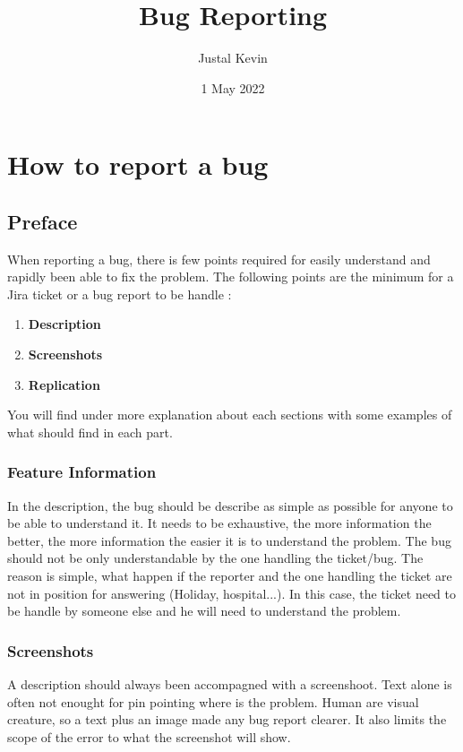 \documentclass[a4paper,article,oneside]{memoir}
\title{\textbf{Bug Reporting}}
\author{Justal Kevin}
\date{1 May 2022}
\begin{document}
\maketitle
\thispagestyle{empty}
\tableofcontents
\part{How to report a bug}
	\chapter*{Preface}
		When reporting a bug, there is few points required for easily understand and rapidly been able to fix the problem. The following points are the minimum for a Jira ticket or a bug report to be handle :
	
        \begin{enumerate}
  			\item {\color{BrickRed}\textbf{Description}}
  			\item {\color{BrickRed}\textbf{Screenshots}}
  			\item {\color{BrickRed}\textbf{Replication}}
		\end{enumerate}
		
	You will find under more explanation about each sections with some examples of what should find in each part.
        \section*{Feature Information}
        In the description, the bug should be describe as simple as possible for anyone to be able to understand it. It needs to be exhaustive, the more information the better, the more information the easier it is to understand the problem. The bug should not be only understandable by the one handling the ticket/bug. The reason is simple, what happen if the reporter and the one handling the ticket are not in position for answering (Holiday, hospital...). In this case, the ticket need to be handle by someone else and he will need to understand the problem.
        \section*{Screenshots}
        A description should always been accompagned with a screenshoot. Text alone is often not enought for pin pointing where is the problem. Human are visual creature, so a text plus an image made any bug report clearer. It also limits the scope of the error to what the screenshot will show.
        
\end{document}
